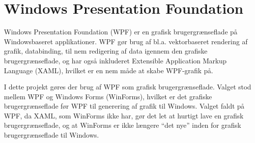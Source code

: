 \section{Windows Presentation Foundation}
Windows Presentation Foundation (WPF) er en grafisk brugergrænseflade på Windowsbaseret applikationer. WPF gør brug af  bl.a. vektorbaseret rendering af grafik, databinding, til nem redigering af data igennem den grafiske brugergrænseflade, og har også inkluderet Extensible Application Markup Language (XAML), hvilket er en nem måde at skabe WPF-grafik på.\citep{wpf} 

I dette projekt gøres der brug af WPF som grafisk brugergrænseflade. Valget stod mellem WPF og Windows Forms (WinForms), hvilket er det grafiske brugergrænseflade før WPF til generering af grafik til Windows. 
Valget faldt på WPF, da XAML, som WinForms ikke har, gør det let at hurtigt lave en grafisk brugergrænseflade, og at WinForms er ikke længere ``det nye'' inden for grafisk brugergrænseflade til Windows. 

